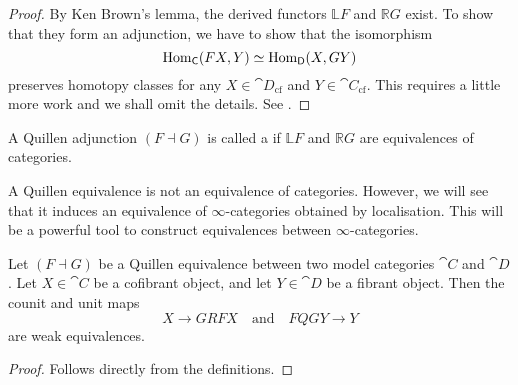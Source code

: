 \begin{proof}
    By Ken Brown's lemma, the derived functors $\mathbb LF$ and $\mathbb RG$ exist.
    To show that they form an adjunction, we have to show that the isomorphism 
    \[ \operatorname{Hom}_{\mathsf{C}}(FX,Y) \simeq \operatorname{Hom}_{\mathsf{D}}(X,GY) \]
    preserves homotopy classes for any $X\in\cat{D}_{\mathrm{cf}}$ and $Y\in\cat{C}_{\mathrm{cf}}$.
    This requires a little more work and we shall omit the details.
    See \cite[Lemma~1.3.10]{hovey}.
\end{proof}

\begin{definition}
    A Quillen adjunction $(F\dashv G)$
    is called a  if
    $\mathbb LF$ and $\mathbb RG$ are equivalences of categories.
\end{definition}

A Quillen equivalence is not an equivalence of categories.
However, we will see that it induces an equivalence of 
$\infty$-categories obtained by localisation.
This will be a powerful tool to construct equivalences
between $\infty$-categories.

\begin{proposition}\label{thm-2-z}
    Let $(F\dashv G)$ be a Quillen equivalence
    between two model categories $\cat C$ and $\cat D$.
    Let $X\in\cat C$ be a cofibrant object,
    and let $Y\in\cat D$ be a fibrant object.
    Then the counit and unit maps 
    \[ X\to G R F X\quad\text{and}\quad F Q G Y\to Y \]
    are weak equivalences.
\end{proposition}

\begin{proof}
    Follows directly from the definitions.
\end{proof}
